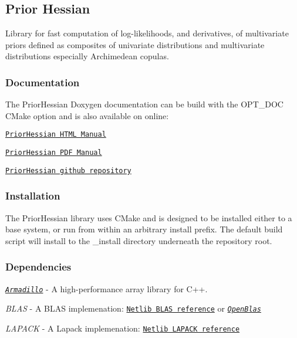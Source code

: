 \href{https://travis-ci.org/markjolah/PriorHessian}{\tt }

\subsection*{Prior Hessian}

Library for fast computation of log-\/likelihoods, and derivatives, of multivariate priors defined as composites of univariate distributions and multivariate distributions especially Archimedean copulas.

\subsubsection*{Documentation}

The Prior\+Hessian Doxygen documentation can be build with the {\ttfamily O\+P\+T\+\_\+\+D\+OC} C\+Make option and is also available on online\+:
\begin{DoxyItemize}
\item \href{https://markjolah.github.io/PriorHessian/index.html}{\tt Prior\+Hessian H\+T\+ML Manual}
\item \href{https://markjolah.github.io/PriorHessian/pdf/PriorHessian-0.2-reference.pdf}{\tt Prior\+Hessian P\+DF Manual}
\item \href{https://github.com/markjolah/PriorHessian}{\tt Prior\+Hessian github repository}
\end{DoxyItemize}

\subsubsection*{Installation}

The Prior\+Hessian library uses C\+Make and is designed to be installed either to a base system, or run from within an arbitrary install prefix. The default build script will install to the {\ttfamily \+\_\+install} directory underneath the repository root. 


\subsubsection*{Dependencies}


\begin{DoxyItemize}
\item \href{http://arma.sourceforge.net/docs.html}{\tt {\itshape Armadillo}} -\/ A high-\/performance array library for C++.
\item {\itshape B\+L\+AS} -\/ A B\+L\+AS implemenation\+: \href{http://www.netlib.org/blas/}{\tt Netlib B\+L\+AS reference} or \href{https://www.openblas.net/}{\tt {\itshape Open\+Blas}}
\item {\itshape L\+A\+P\+A\+CK} -\/ A Lapack implemenation\+: \href{http://www.netlib.org/lapack/}{\tt Netlib L\+A\+P\+A\+CK reference}
\end{DoxyItemize}

